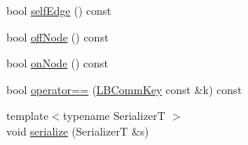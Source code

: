 \begin{DoxyCompactItemize}
\item 
bool \hyperlink{structvt_1_1vrt_1_1collection_1_1balance_1_1_l_b_comm_key_aa1fd1503a2c6d034bf329a1af7ca911a}{self\+Edge} () const
\item 
bool \hyperlink{structvt_1_1vrt_1_1collection_1_1balance_1_1_l_b_comm_key_a77c270338ac89fa8f31457f0b22f1230}{off\+Node} () const
\item 
bool \hyperlink{structvt_1_1vrt_1_1collection_1_1balance_1_1_l_b_comm_key_a6936fbd32052c703881774a5bdc4eec0}{on\+Node} () const
\item 
bool \hyperlink{structvt_1_1vrt_1_1collection_1_1balance_1_1_l_b_comm_key_ad3842428c1eb7648a07e5840c4d5b6c8}{operator==} (\hyperlink{structvt_1_1vrt_1_1collection_1_1balance_1_1_l_b_comm_key}{L\+B\+Comm\+Key} const \&k) const
\item 
{\footnotesize template$<$typename SerializerT $>$ }\\void \hyperlink{structvt_1_1vrt_1_1collection_1_1balance_1_1_l_b_comm_key_ac13d086d419525440a940292fa616d8c}{serialize} (SerializerT \&s)
\end{DoxyCompactItemize}
